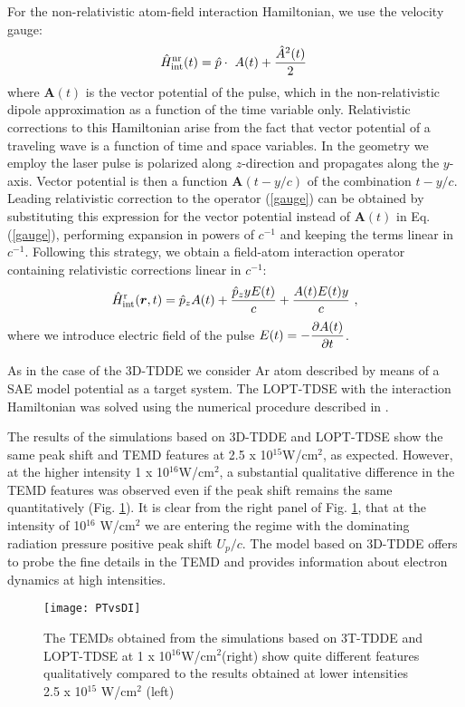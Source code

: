 \documentclass[aps,prl,twocolumn,superscriptaddress,amsmath,amssymb]{revtex4-1}
\begin{document}
For the non-relativistic atom-field interaction Hamiltonian, we use the velocity gauge:
\begin{equation}
\hat H^{\rm nr}_{\rm int}(t) = \hat p\cdot\ {A(t)}+ {\hat A^2(t)\over 2}\,
\label{gauge}   
\end{equation}
where $\bm A (t)$ is the vector potential of the pulse, which in the non-relativistic dipole approximation as a function of the time variable only. Relativistic corrections to this Hamiltonian arise from the fact that vector potential of a traveling wave is a function of time and space variables. In the geometry we employ the laser pulse is polarized along $z$-direction and propagates along the $y$-axis. Vector potential is then a function $\bm A(t-y/c)$ of the combination $t-y/c$. Leading relativistic correction to the operator (\ref{gauge}) can be obtained by substituting this expression for the vector potential instead of $\bm A(t)$ in Eq.(\ref{gauge}), performing expansion in powers of $c^{-1}$ and keeping the terms linear in $c^{-1}$. Following this strategy, we obtain a field-atom interaction operator containing relativistic corrections linear in $c^{-1}$:
\begin{equation}
\hat H^{\rm r}_{\rm int}(\bm r,t) = \hat p_z A(t)+ {\hat p_z y E(t)\over c}+ {A(t)E(t)y\over c} \ ,
\label{gauge1}
\end{equation}
where we introduce electric field of the pulse $\displaystyle E(t)=-{\partial A(t)\over \partial t}$. 

As in the case of the 3D-TDDE we consider Ar atom described by means of a SAE model potential \cite{oep} as a target system. The LOPT-TDSE with the interaction Hamiltonian was solved using the numerical procedure described in \cite{Ivanov2016a}.

The results of the simulations based on 3D-TDDE and LOPT-TDSE show the same peak shift and TEMD features  at 2.5 x 10$^{15}$W/cm$^{2}$, as expected. However, at the higher intensity 1 x 10$^{16}$W/cm$^{2}$, a substantial qualitative difference in the TEMD features was observed even if the peak shift remains the same quantitatively (Fig. \ref {fig:PTvsDI}). It is clear from the right panel of Fig. \ref {fig:PTvsDI}, that at the intensity 
of 10$^{16}$ W/cm$^{2}$
we are entering the regime with the dominating radiation pressure positive peak shift $U_p/c$. The model based on 3D-TDDE offers to probe the fine details in the TEMD and provides information about electron dynamics at high intensities.

\begin{figure}[!ht]
\texttt{[image: PTvsDI]}
\caption{\label{fig:PTvsDI}} The TEMDs obtained from the simulations based on 3T-TDDE and LOPT-TDSE at  1 x 10$^{16}$W/cm$^{2}$(right) show quite different features qualitatively compared to the results obtained at lower intensities 2.5 x 10$^{15}$ W/cm$^{2}$ (left)
\end{figure}
\end{document}
